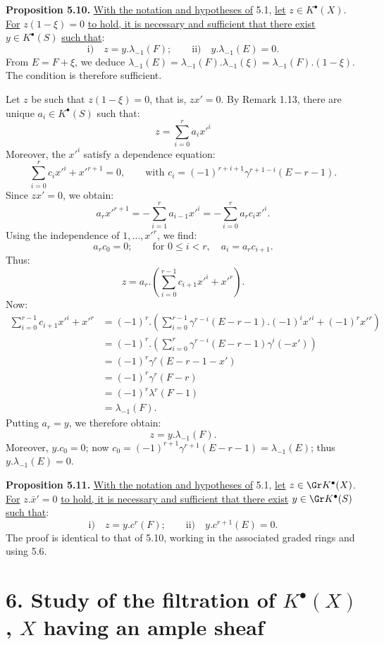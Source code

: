 \textbf{Proposition 5.10.} \uline{With the notation and hypotheses of} 5.1, \uline{let} $z\in K^{\bullet}(X)$. \uline{For} $z(1-\xi)=0$ \uline{to hold, it is necessary and sufficient that there exist} $y\in K^{\bullet}(S)$ \uline{such that}:
\[
  \text{i)}\quad z=y.\lambda_{-1}(F);
  \qquad
  \text{ii)}\quad y.\lambda_{-1}(E)=0.
\]
From $E=F+\xi$, we deduce $\lambda_{-1}(E)=\lambda_{-1}(F).\lambda_{-1}(\xi)=\lambda_{-1}(F).(1-\xi)$. The condition is therefore sufficient.

Let $z$ be such that $z(1-\xi)=0$, that is, $zx'=0$. By Remark 1.13, there are unique $a_i\in K^{\bullet}(S)$ such that:
\[
  z=\sum_{i=0}^{r}a_i{x'}^i
\]
Moreover, the ${x'}^i$ satisfy a dependence equation:
\[
  \sum_{i=0}^{r}c_i{x'}^i+{x'}^{r+1}=0,
  \qquad \text{with } c_i=(-1)^{r+i+1}\gamma^{r+1-i}(E-r-1).
\]
Since $zx'=0$, we obtain:
\[
  a_r{x'}^{r+1}=-\sum_{i=1}^{r}a_{i-1}{x'}^i
  =-\sum_{i=0}^{r}a_rc_i{x'}^i .
\]
Using the independence of $1,\ldots,{x'}^r$, we find:
\[
  a_rc_0=0;
  \qquad \text{for } 0\le i<r,
  \quad a_i=a_rc_{i+1}.
\]
%
Thus:
\[
  z=a_r.\left(\sum_{i=0}^{r-1}c_{i+1}{x'}^i+{x'}^r\right).
\]
Now:
\[
\begin{aligned}
\sum_{i=0}^{r-1}c_{i+1}{x'}^i+{x'}^r
&=(-1)^r.\left(\sum_{i=0}^{r-1}\gamma^{r-i}(E-r-1).(-1)^i{x'}^i+(-1)^r{x'}^r\right)\\
&=(-1)^r.\left(\sum_{i=0}^{r}\gamma^{r-i}(E-r-1)\gamma^i(-x')\right)\\
&=(-1)^r\gamma^r(E-r-1-x')\\
&=(-1)^r\gamma^r(F-r)\\
&=(-1)^r\lambda^r(F-1)\\
&=\lambda_{-1}(F).
\end{aligned}
\]
Putting $a_r=y$, we therefore obtain:
\[
  z=y.\lambda_{-1}(F).
\]
Moreover, $y.c_0=0$; now $c_0=(-1)^{r+1}\gamma^{r+1}(E-r-1)=\lambda_{-1}(E)$; thus $y.\lambda_{-1}(E)=0$.

\textbf{Proposition 5.11.} \uline{With the notation and hypotheses of} 5.1, \uline{let} $z\in \Gr K^{\bullet}(X)$. \uline{For} $z.\bar x'=0$ \uline{to hold, it is necessary and sufficient that there exist} $y\in \Gr K^{\bullet}(S)$ \uline{such that}:
\[
  \text{i)}\quad z=y.c^r(F);
  \qquad
  \text{ii)}\quad y.c^{r+1}(E)=0.
\]
The proof is identical to that of 5.10, working in the associated graded rings and using 5.6.

\section*{6. Study of the filtration of \texorpdfstring{$K^{\bullet}(X)$}{K^{\bullet}(X)}, $X$ having an ample sheaf}

